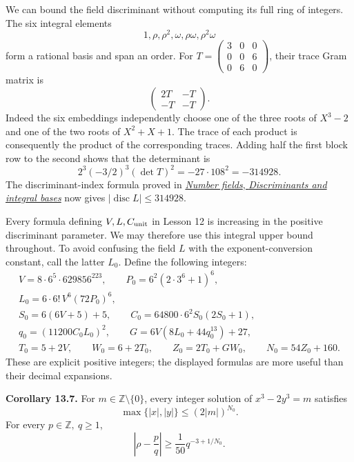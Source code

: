 \documentclass[
  11pt,
  a4paper,
]{article}
\begin{document}
We can bound the field discriminant without computing its full ring of
integers. The six integral elements \[
1,\rho,\rho^2,\omega,\rho\omega,\rho^2\omega
\tag{13.34}
\] form a rational basis and span an order. For
\(T=\begin{pmatrix}3&0&0\\0&0&6\\0&6&0\end{pmatrix}\), their trace Gram
matrix is \[
\begin{pmatrix}2T&-T\\-T&-T\end{pmatrix}.
\tag{13.35}
\] Indeed the six embeddings independently choose one of the three roots
of \(X^3-2\) and one of the two roots of \(X^2+X+1\). The trace of each
product is consequently the product of the corresponding traces. Adding
half the first block row to the second shows that the determinant is \[
2^3(-3/2)^3(\det T)^2=-27\cdot108^2=-314928.
\tag{13.36}
\] The discriminant-index formula proved in
\href{https://kokunoyumeto.github.io/open-math-courses-public/courses/NT-ANT/discriminants-and-integral-bases.html}{\emph{Number
fields}, \emph{Discriminants and integral bases}} now gives
\(|\operatorname{disc}L|\le314928\).

Every formula defining \(V,L,C_{\rm unit}\) in Lesson 12 is increasing
in the positive discriminant parameter. We may therefore use this
integral upper bound throughout. To avoid confusing the field \(L\) with
the exponent-conversion constant, call the latter \(L_0\). Define the
following integers: \[
\begin{gathered}
V=8\cdot6^5\cdot629856^{223},\qquad
P_0=6^2(2\cdot3^6+1)^6,\\
L_0=6\cdot6!\,V^6(72P_0)^6,\\
S_0=6(6V+5)+5,\qquad C_0=64800\cdot6^2S_0(2S_0+1),\\
q_0=(11200C_0L_0)^2,\qquad
G=6V(8L_0+44q_0^{13})+27,\\
T_0=5+2V,\qquad W_0=6+2T_0,\qquad
Z_0=2T_0+GW_0,\qquad N_0=54Z_0+160.
\end{gathered}
\tag{13.37}
\] These are explicit positive integers; the displayed formulas are more
useful than their decimal expansions.

\textbf{Corollary 13.7.} For \(m\in\mathbb Z\setminus\{0\}\), every
integer solution of \(x^3-2y^3=m\) satisfies \[
\max\{|x|,|y|\}\le(2|m|)^{N_0}.
\tag{13.38}
\] For every \(p\in\mathbb Z,\ q\ge1\), \[
\left|\rho-\frac pq\right|
\ge\frac1{50}q^{-3+1/N_0}.
\tag{13.39}
\]
\end{document}
